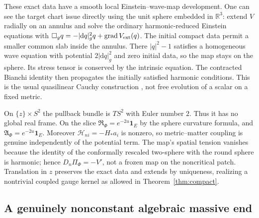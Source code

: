 \documentclass[11pt]{article}
\newcommand{\dd}{\mathrm d}
\newcommand{\id}{\mathbf 1}
\newcommand{\HH}{\mathcal H}
\begin{document}
These exact data have a smooth local Einstein--wave-map development. One can see the target chart issue directly using the unit sphere embedded in \(\mathbb R^3\): extend \(V\) radially on an annulus and solve the ordinary harmonic-reduced Einstein equations with
\(\square_g q=-|\dd q|_g^2 q+\operatorname{grad}V_{\rm ext}(q)\).
The initial compact data permit a smaller common slab inside the annulus. There \(|q|^2-1\) satisfies a homogeneous wave equation with potential \(2|\dd q|_g^2\) and zero initial data, so the map stays on the sphere. Its stress tensor is conserved by the intrinsic equation. The contracted Bianchi identity then propagates the initially satisfied harmonic conditions. This is the usual quasilinear Cauchy construction \cite{CB}, not free evolution of a scalar on a fixed metric.

On \(\{z\}\times S^2\) the pullback bundle is \(TS^2\) with Euler number \(2\). Thus it has no global real frame. On the slice \(\mathfrak R_\Phi=e^{-2u}\id_E\) by the sphere curvature formula, and \(\mathfrak A_\Phi=e^{-2u}\id_E\). Moreover \(\HH_{ni}=-H_*a_i\) is nonzero, so metric--matter coupling is genuine independently of the potential term. The map's spatial tension vanishes because the identity of the conformally rescaled two-sphere with the round sphere is harmonic; hence \(D_n\Pi_\Phi=-V'\), not a frozen map on the noncritical patch. Translation in \(z\) preserves the exact data and extends by uniqueness, realizing a nontrivial coupled gauge kernel as allowed in Theorem~\ref{thm:compact}.

\subsection{A genuinely nonconstant algebraic massive end}
\end{document}
